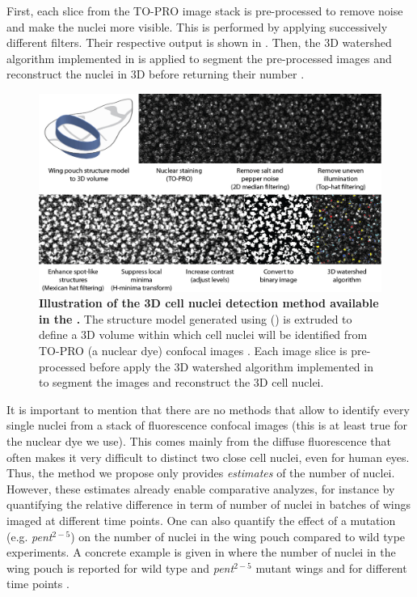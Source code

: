 First, each slice from the TO-PRO image stack is pre-processed to remove noise and make the nuclei more visible. This is performed by applying successively different filters. Their respective output is shown in . Then, the 3D watershed algorithm implemented in \matlab is applied to segment the pre-processed images and reconstruct the nuclei in 3D before returning their number \autocite{meyer1994watershed}.\\

\begin{figure}[!h]
\centering
\includegraphics[scale=0.40]{images/matlab_nuclei_detection_method.jpg}
\caption{\textbf{Illustration of the 3D cell nuclei detection method available in the \wingjMatlab.} The structure model generated using \wingj () is extruded to define a 3D volume within which cell nuclei will be identified from TO-PRO (a nuclear dye) confocal images \autocite{schaffter2013}. Each image slice is pre-processed before apply the 3D watershed algorithm implemented in \matlab to segment the images and reconstruct the 3D cell nuclei.}
\label{fig:matlab_nuclei_detection_method}
\end{figure}

It is important to mention that there are no methods that allow to identify every single nuclei from a stack of fluorescence confocal images (this is at least true for the nuclear dye we use). This comes mainly from the diffuse fluorescence that often makes it very difficult to distinct two close cell nuclei, even for human eyes. Thus, the method we propose only provides \textit{estimates} of the number of nuclei. However, these estimates already enable comparative analyzes, for instance by quantifying the relative difference in term of number of nuclei in batches of wings imaged at different time points. One can also quantify the effect of a mutation (e.g. \textit{pent$^{2-5}$}) on the number of nuclei in the \droso wing pouch compared to wild type experiments. A concrete example is given in  where the number of nuclei in the wing pouch is reported for wild type and \textit{pent$^{2-5}$} mutant wings and for different time points \autocite{schaffter2013}.\\

